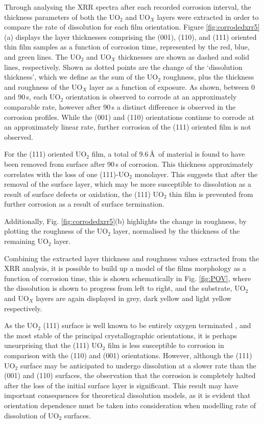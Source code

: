 \documentclass[twocolumn,prl,nobalancelastpage,aps,10pt]{revtex4-1}
\begin{document}
Through analysing the XRR spectra after each recorded corrosion interval, the thickness parameters of both the UO$_2$ and UO$_X$ layers were extracted in order to compare the rate of dissolution for each film orientation. Figure \ref{fig:corrodedxrr5}(a) displays the layer thicknesses comprising the (001), (110), and (111) oriented thin film samples as a function of corrosion time, represented by the red, blue, and green lines. The UO$_2$ and UO$_X$ thicknesses are shown as dashed and solid lines, respectively. Shown as dotted points are the change of the `dissolution thickness', which we define as the sum of the UO$_2$ roughness, plus the thickness and roughness of the UO$_X$ layer as a function of exposure. As shown, between 0 and 90\,s, each UO$_2$ orientation is observed to corrode at an approximately comparable rate, however after 90\,s a distinct difference is observed in the corrosion profiles. While the (001) and (110) orientations continue to corrode at an approximately linear rate, further corrosion of the (111) oriented film is not observed.

For the (111) oriented UO$_2$ film, a total of 9.6\,\AA\, of material is found to have been removed from surface after 90\,s of corrosion. This thickness approximately correlates with the loss of one (111)-UO$_2$ monolayer. This suggests that after the removal of the surface layer, which may be more susceptible to dissolution as a result of surface defects or oxidation, the (111) UO$_2$ thin film is prevented from further corrosion as a result of surface termination.

Additionally, Fig. \ref{fig:corrodedxrr5}(b) highlights the change in roughness, by plotting the roughness of the UO$_2$ layer, normalised by the thickness of the remaining UO$_2$ layer.


Combining the extracted layer thickness and roughness values extracted from the XRR analysis, it is possible to build up a model of the films morphology as a function of corrosion time, this is shown schematically in Fig. \ref{fig:POV}, where the dissolution is shown to progress from left to right, and the substrate, UO$_2$ and UO$_X$ layers are again displayed in grey, dark yellow and light yellow respectively.

As the UO$_2$ (111) surface is well known to be entirely oxygen terminated \cite{Bottin2016,Ellis1980}, and the most stable of the principal crystallographic orientations, it is perhaps unsurprising that the (111) UO$_2$ film is less susceptible to corrosion in comparison with the (110) and (001) orientations. However, although the (111) UO$_2$ surface may be anticipated to undergo dissolution at a slower rate than the (001) and (110) surfaces, the observation that the corrosion is completely halted after the loss of the initial surface layer is significant. This result may have important consequences for theoretical dissolution models, as it is evident that orientation dependence must be taken into consideration when modelling rate of dissolution of UO$_2$ surfaces.
\end{document}

